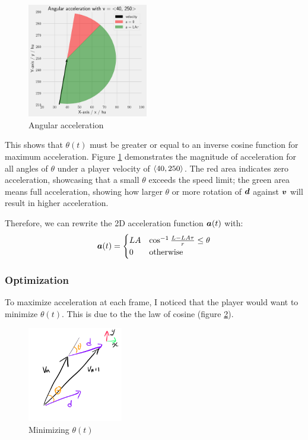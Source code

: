 \begin{figure}
    \includegraphics[width=0.47\textwidth,right]{assets/angular_acceleration_limiting.png}
    \caption{Angular acceleration}
    \label{fig:angular_acceleration_limiting}
\end{figure}

This shows that $\theta(t)$ must be greater or equal to an inverse cosine function for maximum acceleration. Figure \ref{fig:angular_acceleration_limiting} demonstrates the magnitude of acceleration for all angles of $\theta$ under a player velocity of $\left\langle 40, 250 \right\rangle$. The red area indicates zero acceleration, showcasing that a small $\theta$ exceeds the speed limit; the green area means full acceleration, showing how larger $\theta$ or more rotation of $\boldsymbol{d}$ against $\boldsymbol{v}$ will result in higher acceleration.

Therefore, we can rewrite the 2D acceleration function $\boldsymbol{a}(t)$ with:
\[
\boldsymbol{a}(t) = \begin{cases}
    LA & \cos^{-1} \frac{L - LA\tau}{r} \le \theta\\
    0 & \text{otherwise}
\end{cases}
\]


\subsubsection{Optimization}
To maximize acceleration at each frame, I noticed that the player would want to minimize $\theta(t)$. This is due to the the law of cosine (figure \ref{fig:min_theta}).

\begin{figure}
    \includegraphics[width=0.37\textwidth,right]{assets/mini_theta.png}
    \caption{Minimizing $\theta(t)$}
    \label{fig:min_theta}
\end{figure}

